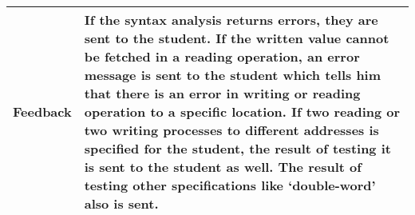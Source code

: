     \begin{tabular}{|p{2cm}|p{11cm}|}
        \hline
        Feedback & If the syntax analysis returns errors, they are sent to the student. If the written value cannot be fetched in a reading operation, 
        an error message is sent to the student which tells him that there is an error in writing or reading operation to a specific location. If two 
        reading or two writing processes to different addresses is specified for the student, the result of testing it is sent to the student as well. 
        The result of testing other specifications like ‘double-word’ also is sent. 
        \\
        \hline 
    \end{tabular}

\newpage
